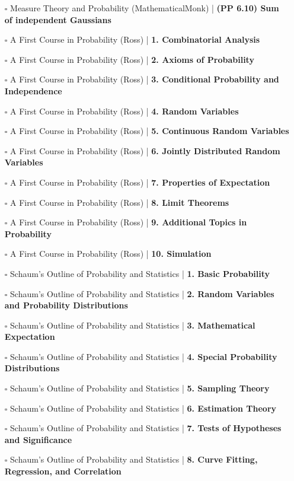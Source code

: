 \documentclass[a4, landscape, 12pt]{article}
\newcommand{\checkbox}{$\square$}%
\begin{document}
\begin{itemize}
{}
\item [\checkbox] Measure Theory and Probability (MathematicalMonk)  | \textbf{(PP 6.10) Sum of independent Gaussians
}
\item [\checkbox] A First Course in Probability (Ross)  | \textbf{1. Combinatorial Analysis
}
\item [\checkbox] A First Course in Probability (Ross)  | \textbf{2. Axioms of Probability
}
\item [\checkbox] A First Course in Probability (Ross)  | \textbf{3. Conditional Probability and Independence
}
\item [\checkbox] A First Course in Probability (Ross)  | \textbf{4. Random Variables
}
\item [\checkbox] A First Course in Probability (Ross)  | \textbf{5. Continuous Random Variables
}
\item [\checkbox] A First Course in Probability (Ross)  | \textbf{6. Jointly Distributed Random Variables
}
\item [\checkbox] A First Course in Probability (Ross)  | \textbf{7. Properties of Expectation
}
\item [\checkbox] A First Course in Probability (Ross)  | \textbf{8. Limit Theorems
}
\item [\checkbox] A First Course in Probability (Ross)  | \textbf{9. Additional Topics in Probability
}
\item [\checkbox] A First Course in Probability (Ross)  | \textbf{10. Simulation
}
\item [\checkbox] Schaum's Outline of Probability and Statistics  | \textbf{1. Basic Probability
}
\item [\checkbox] Schaum's Outline of Probability and Statistics  | \textbf{2. Random Variables and Probability Distributions
}
\item [\checkbox] Schaum's Outline of Probability and Statistics  | \textbf{3. Mathematical Expectation
}
\item [\checkbox] Schaum's Outline of Probability and Statistics  | \textbf{4. Special Probability Distributions
}
\item [\checkbox] Schaum's Outline of Probability and Statistics  | \textbf{5. Sampling Theory
}
\item [\checkbox] Schaum's Outline of Probability and Statistics  | \textbf{6. Estimation Theory
}
\item [\checkbox] Schaum's Outline of Probability and Statistics  | \textbf{7. Tests of Hypotheses and Significance
}
\item [\checkbox] Schaum's Outline of Probability and Statistics  | \textbf{8. Curve Fitting, Regression, and Correlation
}
\end{itemize}
\end{document}
